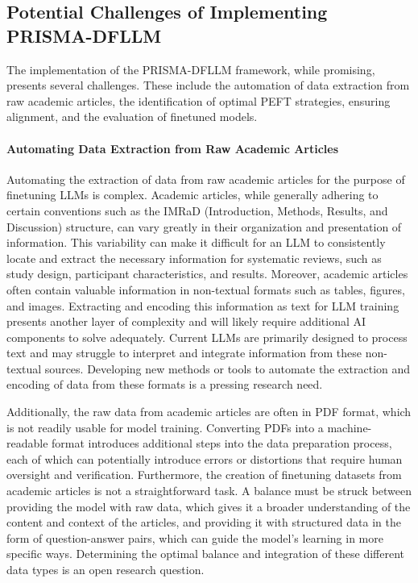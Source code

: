 \documentclass{article}
\begin{document}
\subsection{Potential Challenges of Implementing PRISMA-DFLLM}


The implementation of the PRISMA-DFLLM framework, while promising, presents several challenges. These include the automation of data extraction from raw academic articles, the identification of optimal PEFT strategies, ensuring alignment, and the evaluation of finetuned models.

\paragraph{Automating Data Extraction from Raw Academic Articles}

Automating the extraction of data from raw academic articles for the purpose of finetuning LLMs is complex. Academic articles, while generally adhering to certain conventions such as the IMRaD (Introduction, Methods, Results, and Discussion) structure, can vary greatly in their organization and presentation of information. This variability can make it difficult for an LLM to consistently locate and extract the necessary information for systematic reviews, such as study design, participant characteristics, and results. Moreover, academic articles often contain valuable information in non-textual formats such as tables, figures, and images. Extracting and encoding this information as text for LLM training presents another layer of complexity and will likely require additional AI components to solve adequately. Current LLMs are primarily designed to process text and may struggle to interpret and integrate information from these non-textual sources. Developing new methods or tools to automate the extraction and encoding of data from these formats is a pressing research need.

Additionally, the raw data from academic articles are often in PDF format, which is not readily usable for model training. Converting PDFs into a machine-readable format introduces additional steps into the data preparation process, each of which can potentially introduce errors or distortions that require human oversight and verification. Furthermore, the creation of finetuning datasets from academic articles is not a straightforward task. A balance must be struck between providing the model with raw data, which gives it a broader understanding of the content and context of the articles, and providing it with structured data in the form of question-answer pairs, which can guide the model's learning in more specific ways. Determining the optimal balance and integration of these different data types is an open research question.
\end{document}
